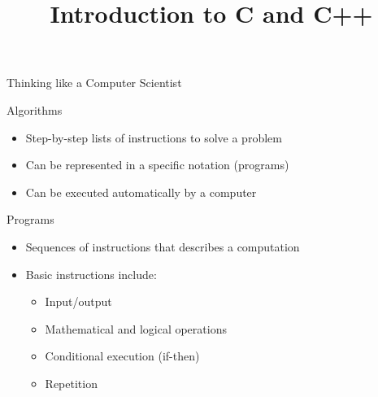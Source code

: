 

\title{Introduction to C and C++}



\maketitle

\begin{frame}{Thinking like a Computer Scientist}
\end{frame}

\begin{frame}{Algorithms}
    \begin{itemize}
        \setlength{\itemsep}{0.75em}
        \item Step\hyp{}by\hyp{}step lists of instructions to solve a problem
        \item Can be represented in a specific notation (programs)
        \item Can be executed automatically by a computer
    \end{itemize}
\end{frame}

\begin{frame}{Programs}
    \begin{itemize}
        \setlength{\itemsep}{0.75em}
        \item Sequences of instructions that describes a computation
        \item Basic instructions include:
              \begin{itemize}
                  \item Input/output
                  \item Mathematical and logical operations
                  \item Conditional execution (if\hyp{}then)
                  \item Repetition
              \end{itemize}
    \end{itemize}
\end{frame}

